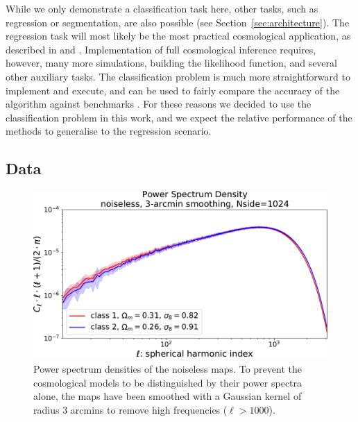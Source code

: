 \documentclass[final,twocolumn,3p,times,sort&compress]{elsarticle}
\newcommand{\secref}[1]{Section~\ref{sec:#1}}
\newcommand{\1}{\b{1}}              %
\newcommand{\0}{\b{0}}              %
\begin{document}
While we only demonstrate a classification task here, other tasks, such as regression or segmentation, are also possible (see \secref{architecture}).
The regression task will most likely be the most practical cosmological application, as described in \citep{gupta2018nongaussianinformation} and \citep{fluri2018deep}.
Implementation of full cosmological inference requires, however, many more simulations, building the likelihood function, and several other auxiliary tasks.
The classification problem is much more straightforward to implement and execute, and can be used to fairly compare the accuracy of the algorithm against benchmarks \citep{schmelze2017cosmologicalmodel}.
For these reasons we decided to use the classification problem in this work, and we expect the relative performance of the methods to generalise to the regression scenario.

\subsection{Data}
\label{sec:data}

\begin{figure}[t!]
	\centering
	\includegraphics[width=\linewidth]{psd_sigma3}
	\caption{Power spectrum densities of the noiseless maps.
		To prevent the cosmological models to be distinguished by their power spectra alone, the maps have been smoothed with a Gaussian kernel of radius $3$ arcmins to remove high frequencies ($\ell>1000$).}
	\label{fig:psd_sigma3}
\end{figure}
\end{document}
